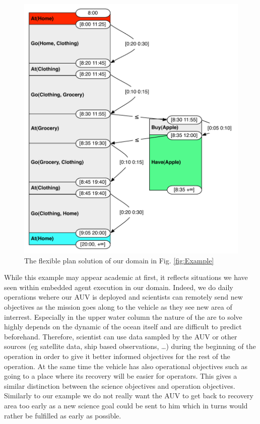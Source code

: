 \begin{figure}
  \centering
  \includegraphics[width=0.8\columnwidth]{figs/example_plan}
  \caption{The flexible plan solution of our domain in
    Fig. \ref{fig:Example}}
  \label{fig:ex:plan}
\end{figure}

While this example may appear academic at first, it reflects situations
we have seen within embedded agent execution in our domain. Indeed, we
do daily operations wehere our AUV is deployed and scientists can
remotely send new objectives as the mission goes along to the vehicle
as they see new area of interrest. Especially in the upper water
column the nature of the are to solve highly depends on the dynamic of
the ocean itself and are difficult to predict beforehand. Therefore,
scientist can use data sampled by the AUV or other sources (eg
satellite data, ship based observations, \dots{}) during the beginning of
the operation in order to give it better informed objectives for the
rest of the operation. At the same time the vehicle has
also operational objectives such as going to a place where its
recovery will be easier for operators. This gives a similar
distinction between the science objectives and operation
objectives. Similarly to our example we do not really want the
AUV to get back to recovery area too early as a new science goal could
be sent to him which in turns would rather be fulfilled as early as
possible.

